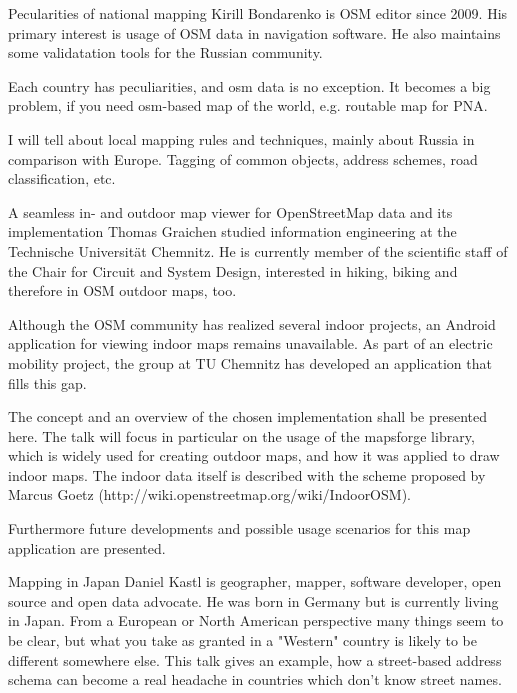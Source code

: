 %
{Pecularities of national mapping}%
{Kirill Bondarenko is OSM editor since 2009. His primary interest is usage of OSM data in navigation software. He also maintains some validatation tools for the Russian community.}%
{Each country has peculiarities, and osm data is no exception. It becomes a big problem, if you need osm-based map of the world, e.g. routable map for PNA.

I will tell about local mapping rules and techniques, mainly about Russia in comparison with Europe. Tagging of common objects, address schemes, road classification, etc.}


%
{A seamless in- and outdoor map viewer for OpenStreetMap data and its implementation}%
{Thomas Graichen studied information engineering at the Technische Universität Chemnitz. He is currently member of the scientific staff of the Chair for Circuit and System Design, interested in hiking, biking and therefore in OSM outdoor maps, too.}%
{Although the OSM community has realized several indoor projects, an Android application for viewing indoor maps remains unavailable. As part of an electric mobility project, the group at TU Chemnitz has developed an application that fills this gap.

The concept and an overview of the chosen implementation shall be presented here. The talk will focus in particular on the usage of the mapsforge library, which is widely used for creating outdoor maps, and how it was applied to draw indoor maps. The indoor data itself is described with the scheme proposed by Marcus Goetz (http://wiki.openstreetmap.org/wiki/IndoorOSM).

Furthermore future developments and possible usage scenarios for this map application are presented.}


%
{Mapping in Japan}%
{Daniel Kastl is geographer, mapper, software developer, open source and open data advocate. He was born in Germany but is currently living in Japan.}%
{From a European or North American perspective many things seem to be clear, but what you take as granted in a "Western" country is likely to be different somewhere else.
This talk gives an example, how a street-based address schema can become a real headache in countries which don't know street names.}

